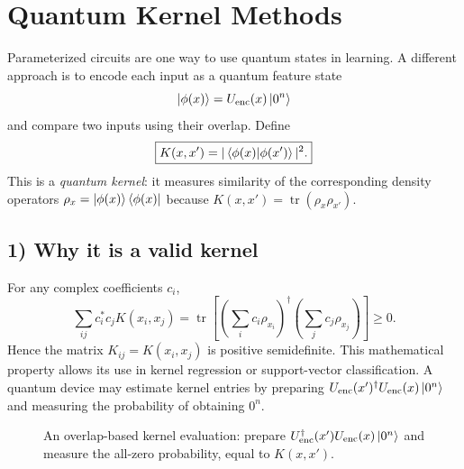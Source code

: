 \section{Quantum Kernel Methods}
Parameterized circuits are one way to use quantum states in learning. A different approach is to encode each input as a quantum feature state
\begin{equation}
 \left|\phi(x)\right\rangle=U_{\mathrm{enc}}(x)\left|0^n\right\rangle
\end{equation}
and compare two inputs using their overlap. Define
\begin{equation}\label{eq:qkernel}
\boxed{K(x,x')=|\left\langle\phi(x)\middle|\phi(x')\right\rangle|^2.}
\end{equation}
This is a \emph{quantum kernel}: it measures similarity of the corresponding density operators $\rho_x=\left|\phi(x)\right\rangle\left\langle\phi(x)\right|$ because $K(x,x')=\operatorname{tr}(\rho_x\rho_{x'})$.

\subsection*{1) Why it is a valid kernel}
For any complex coefficients $c_i$,
\begin{equation}
\sum_{ij}c_i^*c_jK(x_i,x_j)
=\operatorname{tr}\left[\left(\sum_i c_i\rho_{x_i}\right)^\dagger
\left(\sum_jc_j\rho_{x_j}\right)\right]\ge0.
\end{equation}
Hence the matrix $K_{ij}=K(x_i,x_j)$ is positive semidefinite. This mathematical property allows its use in kernel regression or support-vector classification. A quantum device may estimate kernel entries by preparing $U_{\mathrm{enc}}(x')^\dagger U_{\mathrm{enc}}(x)\left|0^n\right\rangle$ and measuring the probability of obtaining $0^n$.

\begin{figure}[htbp]
\centering
{}
\caption{An overlap-based kernel evaluation: prepare $U_{\rm enc}^{\dagger}(x')U_{\rm enc}(x)\left|0^n\right\rangle$ and measure the all-zero probability, equal to $K(x,x')$.}
\label{fig:qml-overlap-circuit}
\end{figure}
